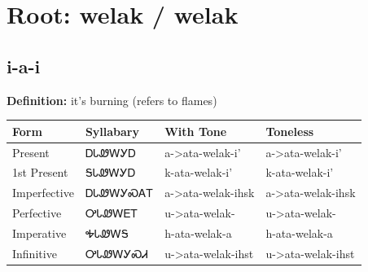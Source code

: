 \documentclass{article}%
\begin{document}
%
\normalsize%
\section*{Root: welak / welak}%
\subsection*{i-a-i}%
\textbf{Definition: }%
it’s burning (refers to flames)%
\\[0.5em]%
\begin{tabular}{|l|l|l|l|}%
\hline%
\textbf{Form}&\textbf{Syllabary}&\textbf{With Tone}&\textbf{Toneless}\\%
\hline%
Present&ᎠᏓᏪᎳᎩᎠ&a{-}>ata{-}welak{-}i'&a{-}>ata{-}welak{-}i'\\%
1st Present&ᎦᏓᏪᎳᎩᎠ&k{-}ata{-}welak{-}i'&k{-}ata{-}welak{-}i'\\%
Imperfective&ᎠᏓᏪᎳᎩᏍᎪᎢ&a{-}>ata{-}welak{-}ihsk&a{-}>ata{-}welak{-}ihsk\\%
Perfective&ᎤᏓᏪᎳᎬᎢ&u{-}>ata{-}welak{-}&u{-}>ata{-}welak{-}\\%
Imperative&ᎭᏓᏪᎳᎦ&h{-}ata{-}welak{-}a&h{-}ata{-}welak{-}a\\%
Infinitive&ᎤᏓᏪᎳᎩᏍᏗ&u{-}>ata{-}welak{-}ihst&u{-}>ata{-}welak{-}ihst\\%
\hline%
\end{tabular}%
\\[1em]%
\end{document}

